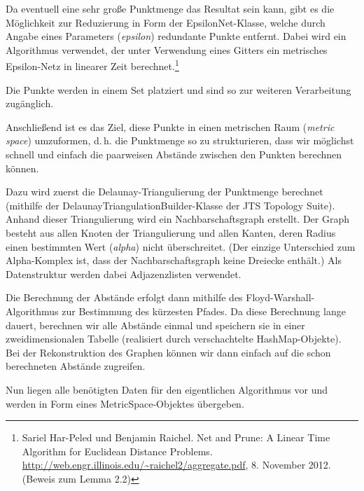 \documentclass[parskip=half,
 fontsize=12pt, bibtotoc,
 ngerman]
 {article}
\begin{document}
Da eventuell eine sehr große Punktmenge das Resultat sein kann, gibt es die Möglichkeit zur Reduzierung in Form der EpsilonNet-Klasse, welche durch Angabe eines Parameters (\emph{epsilon}) redundante Punkte entfernt. Dabei wird ein Algorithmus verwendet, der unter Verwendung eines Gitters ein metrisches Epsilon-Netz in linearer Zeit berechnet.\footnote{Sariel Har-Peled und Benjamin Raichel. Net and Prune: A Linear Time Algorithm for Euclidean Distance Problems. \url{http://web.engr.illinois.edu/~raichel2/aggregate.pdf}, 8. November 2012. (Beweis zum Lemma 2.2)}

Die Punkte werden in einem Set platziert und sind so zur weiteren Verarbeitung zugänglich.

Anschließend ist es das Ziel, diese Punkte in einen metrischen Raum (\textit{metric space}) umzuformen, d.\,h. die Punktmenge so zu strukturieren, dass wir möglichst schnell und einfach die paarweisen Abstände zwischen den Punkten berechnen können.

Dazu wird zuerst die Delaunay-Triangulierung der Punktmenge berechnet (mithilfe der DelaunayTriangulationBuilder-Klasse der JTS Topology Suite). Anhand dieser Triangulierung wird ein Nachbarschaftsgraph erstellt. Der Graph besteht aus allen Knoten der Triangulierung und allen Kanten, deren Radius einen bestimmten Wert (\emph{alpha}) nicht überschreitet. (Der einzige Unterschied zum Alpha-Komplex ist, dass der Nachbarschaftsgraph keine Dreiecke enthält.) Als Datenstruktur werden dabei Adjazenzlisten verwendet.

Die Berechnung der Abstände erfolgt dann mithilfe des Floyd-Warshall-Algorithmus zur Bestimmung des kürzesten Pfades. Da diese Berechnung lange dauert, berechnen wir alle Abstände einmal und speichern sie in einer zweidimensionalen Tabelle (realisiert durch verschachtelte HashMap-Objekte). Bei der Rekonstruktion des Graphen können wir dann einfach auf die schon berechneten Abstände zugreifen.

Nun liegen alle benötigten Daten für den eigentlichen Algorithmus vor und werden in Form eines MetricSpace-Objektes übergeben.
\end{document}
